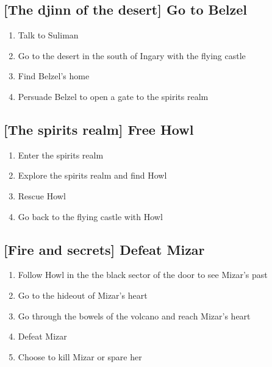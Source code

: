 \subsection{[The djinn of the desert] Go to Belzel}
\begin{enumerate}
\item Talk to Suliman
\item Go to the desert in the south of Ingary with the flying castle
\item Find Belzel's home
\item Persuade Belzel to open a gate to the spirits realm
\end{enumerate}

\subsection{[The spirits realm] Free Howl}
\begin{enumerate}
\item Enter the spirits realm
\item Explore the spirits realm and find Howl
\item Rescue Howl
\item Go back to the flying castle with Howl
\end{enumerate}

\subsection{[Fire and secrets] Defeat Mizar}
\begin{enumerate}
\item Follow Howl in the the black sector of the door to see Mizar's past
\item Go to the hideout of Mizar's heart
\item Go through the bowels of the volcano and reach Mizar's heart
\item Defeat Mizar
\item Choose to kill Mizar or spare her
\end{enumerate}
